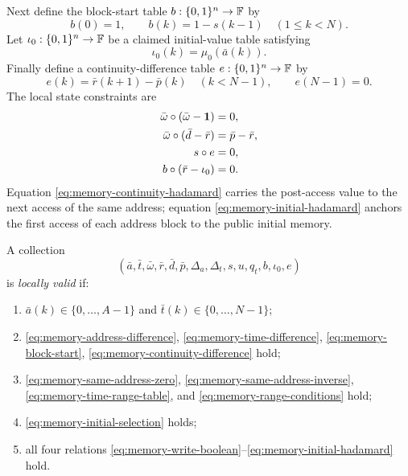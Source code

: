 Next define the block-start table $b:\{0,1\}^n\to\mathbb{F}$ by
\begin{equation}
  b(0)=1,
  \qquad
  b(k)=1-s(k-1)\quad(1\le k<N).
  \label{eq:memory-block-start}
\end{equation}
Let $\iota_0:\{0,1\}^n\to\mathbb{F}$ be a claimed initial-value table satisfying
\begin{equation}
  \iota_0(k)=\mu_0(\bar a(k)).
  \label{eq:memory-initial-selection}
\end{equation}
Finally define a continuity-difference table $e:\{0,1\}^n\to\mathbb{F}$ by
\begin{equation}
  e(k)=\bar r(k+1)-\bar p(k)
  \quad(k<N-1),
  \qquad
  e(N-1)=0.
  \label{eq:memory-continuity-difference}
\end{equation}
The local state constraints are
\begin{align}
  \bar\omega\circ(\bar\omega-\mathbf1)&=0,
  \label{eq:memory-write-boolean}\\
  \bar\omega\circ(\bar d-\bar r)&=\bar p-\bar r,
  \label{eq:memory-post-hadamard}\\
  s\circ e&=0,
  \label{eq:memory-continuity-hadamard}\\
  b\circ(\bar r-\iota_0)&=0.
  \label{eq:memory-initial-hadamard}
\end{align}
Equation \eqref{eq:memory-continuity-hadamard} carries the post-access value to the next access of the same address; equation \eqref{eq:memory-initial-hadamard} anchors the first access of each address block to the public initial memory.

\begin{definition}
\label{def:memory-locally-valid-sorted}
A collection
\[
  (\bar a,\bar t,\bar\omega,\bar r,\bar d,
    \bar p,\Delta_a,\Delta_t,s,u,q_t,b,\iota_0,e)
\]
is \emph{locally valid} if:
\begin{enumerate}[label=(\roman*),leftmargin=*]
  \item $\bar a(k)\in\{0,\ldots,A-1\}$ and $\bar t(k)\in\{0,\ldots,N-1\}$;
  \item \eqref{eq:memory-address-difference}, \eqref{eq:memory-time-difference}, \eqref{eq:memory-block-start}, \eqref{eq:memory-continuity-difference} hold;
  \item \eqref{eq:memory-same-address-zero}, \eqref{eq:memory-same-address-inverse}, \eqref{eq:memory-time-range-table}, and \eqref{eq:memory-range-conditions} hold;
  \item \eqref{eq:memory-initial-selection} holds;
  \item all four relations \eqref{eq:memory-write-boolean}--\eqref{eq:memory-initial-hadamard} hold.
\end{enumerate}
\end{definition}

